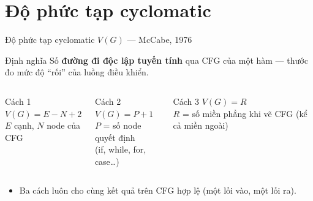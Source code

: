 \documentclass[aspectratio=169,12pt]{beamer}
\begin{document}
\section{Độ phức tạp cyclomatic}

\begin{frame}{Độ phức tạp cyclomatic $V(G)$ --- McCabe, 1976}
  \begin{block}{Định nghĩa \cite{mccabe}}
    Số \textbf{đường đi độc lập tuyến tính} qua CFG của một hàm ---
    thước đo mức độ ``rối'' của luồng điều khiển.
  \end{block}

  \vspace{0.3em}
  \begin{columns}[T]
    \begin{exampleblock}{Cách 1}
      \centering
      $V(G) = E - N + 2$\\[0.2em]
      {\small $E$ cạnh, $N$ node của CFG}
    \end{exampleblock}

    \begin{exampleblock}{Cách 2}
      \centering
      $V(G) = P + 1$\\[0.2em]
      {\small $P$ = số node quyết định\\(if, while, for, case\ldots)}
    \end{exampleblock}

    \begin{exampleblock}{Cách 3}
      \centering
      $V(G) = R$\\[0.2em]
      {\small $R$ = số miền phẳng khi vẽ CFG (kể cả miền ngoài)}
    \end{exampleblock}
  \end{columns}

  \vspace{0.4em}
  \begin{itemize}
    \item Ba cách luôn cho cùng kết quả trên CFG hợp lệ
          (một lối vào, một lối ra).
  \end{itemize}
\end{frame}
\end{document}
